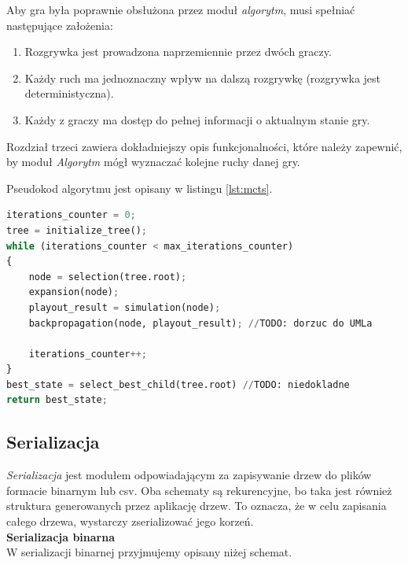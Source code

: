\documentclass{article}
\newcommand{\modulename}[1]{\textit{#1}}
\begin{document}
	\noindent Aby gra była poprawnie obsłużona przez moduł \modulename{algorytm}, musi spełniać następujące założenia: \\
		
	\begin{enumerate}
		\item Rozgrywka jest prowadzona naprzemiennie przez dwóch graczy.
		\item Każdy ruch ma jednoznaczny wpływ na dalszą rozgrywkę (rozgrywka jest deterministyczna).
		\item Każdy z graczy ma dostęp do pełnej informacji o aktualnym stanie gry. \\
	\end{enumerate} 
	
	\noindent Rozdział trzeci zawiera dokładniejszy opis funkcjonalności, które należy zapewnić, by moduł \modulename{Algorytm} mógł wyznaczać kolejne ruchy danej gry.
	
	\clearpage
	
	\noindent Pseudokod algorytmu jest opisany w listingu \ref{lst:mcts}.
\begin{lstlisting}[language=Python, caption=Pseudokod algorytmu Monte Carlo Tree Search, label=lst:mcts]
iterations_counter = 0;
tree = initialize_tree();
while (iterations_counter < max_iterations_counter)
{
	node = selection(tree.root);
	expansion(node);
	playout_result = simulation(node);
	backpropagation(node, playout_result); //TODO: dorzuc do UMLa
	
	iterations_counter++;
}
best_state = select_best_child(tree.root) //TODO: niedokladne
return best_state;
\end{lstlisting}

	
	\clearpage
	
	\subsection{Serializacja}
	\modulename{Serializacja} jest modułem odpowiadającym za zapisywanie drzew do plików formacie binarnym lub csv. Oba schematy są rekurencyjne, bo taka jest również struktura generowanych przez aplikację drzew. To oznacza, że w celu zapisania całego drzewa, wystarczy zserializować jego korzeń.\\
	
	\noindent \textbf{\large Serializacja binarna} \\
	W serializacji binarnej przyjmujemy opisany niżej schemat.\\
\end{document}
